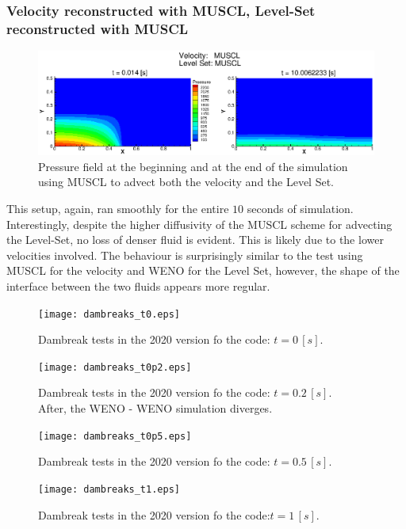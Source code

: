 \documentclass[11pt, a4paper, oneside, openany]{book}
\begin{document}
\subsubsection{Velocity reconstructed with MUSCL, Level-Set reconstructed with MUSCL}
\begin{figure}[!ht]
	\centering
	\includegraphics[width=1\textwidth]{dambreak2020_V_MUSCL_LS_MUSCL_Pressure.eps}
	\caption[Dambreak 2020 MUSCL - MUSCL Pressure field]{Pressure field at the beginning and at the end of the simulation using MUSCL to advect both the velocity and the Level Set.}\label{dambreak2020_V_MUSCL_LS_MUSCL_Pressure}
\end{figure}\noindent
This setup, again, ran smoothly for the entire $10$ seconds of simulation. Interestingly, despite the higher diffusivity of the MUSCL scheme for advecting the Level-Set, no loss of denser fluid is evident. This is likely due to the lower velocities involved. The behaviour is surprisingly similar to the test using MUSCL for the velocity and WENO for the Level Set, however, the shape of the interface between the two fluids appears more regular.
\begin{figure}[!ht]
	\centering
	\texttt{[image: dambreaks\_t0.eps]}
	\caption[Dambreak 2020 Code t=0s]{Dambreak tests in the 2020 version fo the code: $t=0\,[s]$.}\label{Dambreak4Tests_1}
\end{figure}
\begin{figure}
		\centering
		\texttt{[image: dambreaks\_t0p2.eps]}
		\caption[Dambreak 2020 Code t=0.2s]{Dambreak tests in the 2020 version fo the code: $t=0.2\,[s]$.\\After, the WENO - WENO simulation diverges.}\label{Dambreak4Tests_2}
\end{figure}
\begin{figure}[!ht]
	\centering
	\texttt{[image: dambreaks\_t0p5.eps]}
	\caption[Dambreak 2020 Code t=0.5s]{Dambreak tests in the 2020 version fo the code: $t=0.5\,[s]$.}\label{Dambreak4Tests_3}
\end{figure}
\begin{figure}[!ht]
	\centering
	\texttt{[image: dambreaks\_t1.eps]}
	\caption[Dambreak 2020 Code t=1s]{Dambreak tests in the 2020 version fo the code:$t=1\,[s]$.}\label{Dambreak4Tests_4}
\end{figure}
\end{document}
